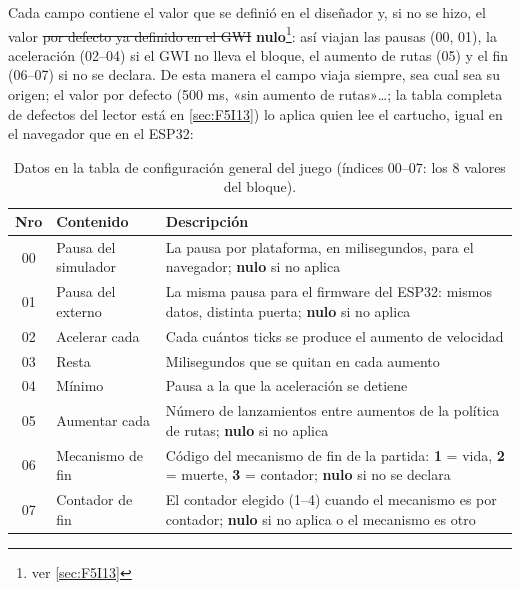 Cada campo contiene
el valor que se definió en el diseñador y, si no se hizo, el valor \sout{por
defecto ya definido en el GWI} \textbf{nulo}\footnote{ver \ref{sec:F5I13}}: así viajan las pausas (00, 01), la aceleración (02--04) si el GWI no lleva el bloque, el aumento de rutas (05) y el fin (06--07) si no se declara. De esta manera el campo viaja siempre, sea cual
sea su origen; el valor por defecto (500 ms, «sin aumento de rutas»…; la tabla completa de defectos del lector está en \ref{sec:F5I13}) lo aplica quien lee el cartucho, igual en el navegador que en el ESP32:

\begin{table}[H]
	\centering
	\begin{tabular}{|c|l|p{9.5cm}|}
		\hline
		\textbf{Nro} & \textbf{Contenido} & \textbf{Descripción} \\
		\hline
		
		00 & Pausa del simulador & La pausa por plataforma, en milisegundos, para el navegador; \textbf{nulo} si no aplica  \\ \hline
		
		01 & Pausa del externo & La misma pausa para el firmware del ESP32: mismos datos, distinta puerta; \textbf{nulo} si no aplica  \\ \hline
		
		02 & Acelerar cada & Cada cuántos ticks se produce el aumento de velocidad\\ \hline
		
		03 & Resta & Milisegundos que se quitan en cada aumento\\ \hline
		
		04 & Mínimo & Pausa a la que la aceleración se detiene\\ \hline
		
		05 & Aumentar cada & Número de lanzamientos entre aumentos de la política de rutas; \textbf{nulo} si no aplica  \\ \hline
		
		06 & Mecanismo de fin & Código del mecanismo de fin de la partida: \textbf{1} = vida, \textbf{2} = muerte, \textbf{3} = contador; \textbf{nulo} si no se declara \\ \hline
		
		07 & Contador de fin & El contador elegido (1--4) cuando el mecanismo es por contador; \textbf{nulo} si no aplica o el mecanismo es otro \\ \hline
			
	\end{tabular}
	\caption{Datos en la tabla de configuración general del juego (índices 00--07: los 8 valores del bloque).}
	\label{tab:A02ConfGeneral}
\end{table}

